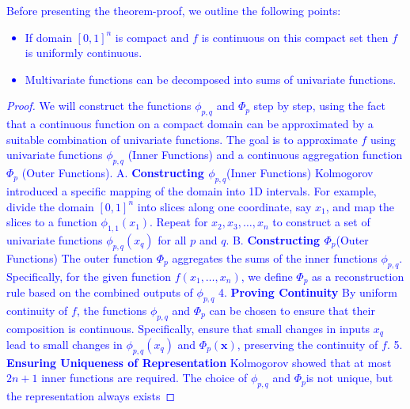 \textcolor{blue}{
Before presenting the theorem-proof, we outline the following points:
\begin{itemize}
    \item If domain $[0,1]^n$ is compact and $f$ is continuous on this compact set then $f$ is uniformly continuous.
    \item Multivariate functions can be decomposed into sums of univariate functions.
\end{itemize}
\begin{proof}
We will construct the functions $\phi_{p,q}$ and $\Phi_p$ step by step, using the fact that a continuous function on a compact domain can be approximated by a suitable combination of univariate functions. The goal is to approximate $f$ using univariate functions $\phi_{p,q}$ (Inner Functions) and a continuous aggregation function $\Phi_p$ (Outer Functions).
A. \textbf{Constructing $\phi_{p,q}$}(Inner Functions)
Kolmogorov introduced a specific mapping of the domain into 1D intervals. For example, divide the domain $[0, 1]^n$ into slices along one coordinate, say $x_1$, and map the slices to a function $\phi_{1,1}(x_1)$. Repeat for $x_2,x_3,\ldots,x_n$ to construct a set of univariate functions $\phi_{p,q}(x_q)$ for all $p$ and $q$.
B. \textbf{Constructing $\Phi_p$}(Outer Functions)
The outer function $\Phi_p$ aggregates the sums of the inner functions $\phi_{p,q}$. Specifically, for the given function $f(x_1, \ldots,x_n)$, we define $\Phi_p$ as a reconstruction rule based on the combined outputs of $\phi_{p,q}$
4. \textbf{Proving Continuity}
By uniform continuity of $f$, the functions $\phi_{p,q}$ and $\Phi_p$
can be chosen to ensure that their composition is continuous. Specifically, ensure that small changes in inputs $x_q$ lead to small changes in $\phi_{p,q}(x_q)$ and $\Phi_{p}(\textbf{x})$, preserving the continuity of $f$.
5. \textbf{Ensuring Uniqueness of Representation}
Kolmogorov showed that at most $2n+1$ inner functions are required. The choice of $\phi_{p,q}$ and $\Phi_{p}$is not unique, but the representation always exists
\end{proof}
}